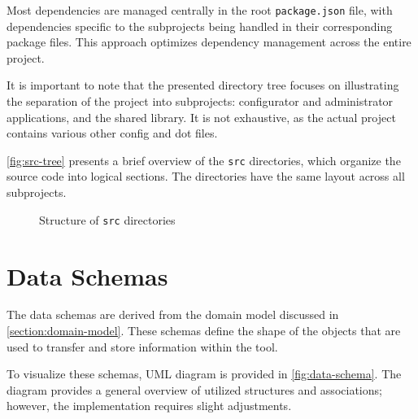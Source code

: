 Most dependencies are managed centrally in the root \texttt{package.json} file, with dependencies specific to the subprojects being handled in their corresponding package files. This approach optimizes dependency management across the entire project.

It is important to note that the presented directory tree focuses on illustrating the separation of the project into subprojects: configurator and administrator applications, and the shared library. It is not exhaustive, as the actual project contains various other config and dot files.

\autoref{fig:src-tree} presents a brief overview of the \texttt{src} directories, which organize the source code into logical sections. The directories have the same layout across all subprojects.

\begin{figure}[h]
    \centering
    \begin{minipage}{\textwidth}
    \end{minipage}
    \caption{Structure of \texttt{src} directories}
    \label{fig:src-tree}
\end{figure}

\section{Data Schemas} \label{section:data-schemas}

The data schemas are derived from the domain model discussed in \autoref{section:domain-model}. These schemas define the shape of the objects that are used to transfer and store information within the tool. 

To visualize these schemas, UML diagram is provided in \autoref{fig:data-schema}. The diagram provides a general overview of utilized structures and associations; however, the implementation requires slight adjustments.

